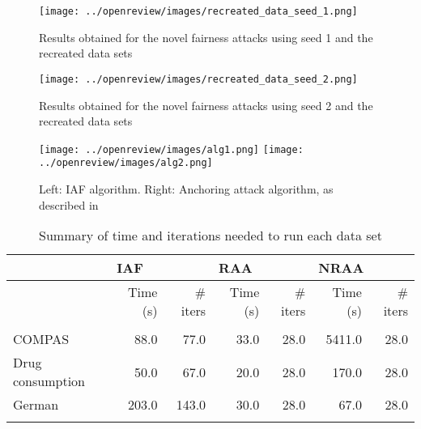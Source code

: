 \begin{figure}[h!]
\texttt{[image: ../openreview/images/recreated\_data\_seed\_1.png]}
\centering
\caption{Results obtained for the novel fairness attacks using seed 1 and the recreated data sets}
\label{recreated_seed1}
\end{figure}

\begin{figure}[h!]
\texttt{[image: ../openreview/images/recreated\_data\_seed\_2.png]}
\centering
\caption{Results obtained for the novel fairness attacks using seed 2 and the recreated data sets}
\label{recreated_seed2}
\end{figure}

\begin{figure}[h!]
\texttt{[image: ../openreview/images/alg1.png]}
\texttt{[image: ../openreview/images/alg2.png]}
\centering
\caption{Left: IAF algorithm. Right: Anchoring attack algorithm, as described in \cite{mehrabi2020exacerbating}}
\label{alg}
\label{alg2}
\end{figure}

\begin{table}[h!]
    \centering
    \begin{tabular}{l r r r r r r}
    &\multicolumn{2}{l}{IAF} & \multicolumn{2}{l}{RAA} & \multicolumn{2}{l}{NRAA} \\ \hline 
    & Time (s) & \# iters & Time (s) & \# iters & Time (s) & \# iters \\
    \hline\\
    COMPAS  &     88.0 &    77.0 &     33.0 &    28.0 &   5411.0 &    28.0 \\
    Drug consumption &     50.0 &    67.0 &     20.0 &    28.0 &    170.0 &    28.0 \\
    German           &    203.0 &   143.0 &     30.0 &    28.0 &     67.0 &    28.0 \\
    \bottomrule\\
    \end{tabular}
    \vspace{0.2cm}
    \caption{Summary of time and iterations needed to run each data set}
    \label{table:time_iter}
\end{table}

